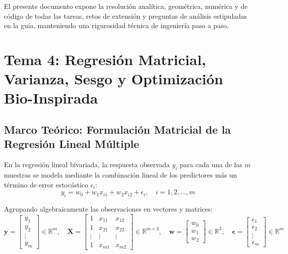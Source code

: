 \documentclass[12pt,a4paper]{article}
\newcommand{\R}{\mathbb{R}}
\begin{document}
El presente documento expone la resolución analítica, geométrica, numérica y de código de todas las tareas, retos de extensión y preguntas de análisis estipuladas en la guía, manteniendo una rigurosidad técnica de ingeniería paso a paso.

\newpage
\section{Tema 4: Regresión Matricial, Varianza, Sesgo y Optimización Bio-Inspirada}

\subsection{Marco Teórico: Formulación Matricial de la Regresión Lineal Múltiple}

En la regresión lineal bivariada, la respuesta observada $y_i$ para cada una de las $m$ muestras se modela mediante la combinación lineal de los predictores más un término de error estocástico $\epsilon_i$:
\begin{equation}
  y_i = w_0 + w_1 x_{i1} + w_2 x_{i2} + \epsilon_i, \quad i = 1, 2, \dots, m
\end{equation}

Agrupando algebraicamente las observaciones en vectores y matrices:
\begin{equation}
  \mathbf{y} = 
  \begin{bmatrix}
    y_1 \\ y_2 \\ \vdots \\ y_m
  \end{bmatrix} \in \R^{m}, \quad
  \mathbf{X} = 
  \begin{bmatrix}
    1 & x_{11} & x_{12} \\
    1 & x_{21} & x_{22} \\
    \vdots & \vdots & \vdots \\
    1 & x_{m1} & x_{m2}
  \end{bmatrix} \in \R^{m \times 3}, \quad
  \mathbf{w} = 
  \begin{bmatrix}
    w_0 \\ w_1 \\ w_2
  \end{bmatrix} \in \R^{3}, \quad
  \boldsymbol{\epsilon} = 
  \begin{bmatrix}
    \epsilon_1 \\ \epsilon_2 \\ \vdots \\ \epsilon_m
  \end{bmatrix} \in \R^{m}
\end{equation}
\end{document}

